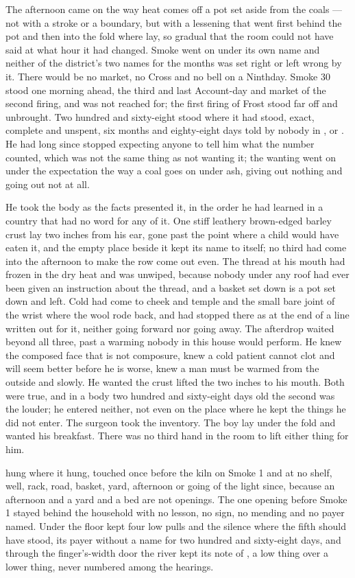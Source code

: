 The afternoon came on the way heat comes off a pot set aside from the coals --- not with a stroke or a boundary, but with a lessening that went first behind the pot and then into the fold where  lay, so gradual that the room could not have said at what hour it had changed. Smoke went on under its own name and neither of the district's two names for the months was set right or left wrong by it. There would be no market, no Cross and no bell on a Ninthday. Smoke 30 stood one morning ahead, the third and last Account-day and market of the second firing, and was not reached for; the first firing of Frost stood far off and unbrought. Two hundred and sixty-eight stood where it had stood, exact, complete and unspent, six months and eighty-eight days told by nobody in ,  or . He had long since stopped expecting anyone to tell him what the number counted, which was not the same thing as not wanting it; the wanting went on under the expectation the way a coal goes on under ash, giving out nothing and going out not at all.

He took the body as the facts presented it, in the order he had learned in a country that had no word for any of it. One stiff leathery brown-edged barley crust lay two inches from his ear, gone past the point where a child would have eaten it, and the empty place beside it kept its name to itself; no third had come into the afternoon to make the row come out even. The thread at his mouth had frozen in the dry heat and was unwiped, because nobody under any roof had ever been given an instruction about the thread, and a basket set down is a pot set down and left. Cold had come to cheek and temple and the small bare joint of the wrist where the wool rode back, and had stopped there as at the end of a line written out for it, neither going forward nor going away. The afterdrop waited beyond all three, past a warming nobody in this house would perform. He knew the composed face that is not composure, knew a cold patient cannot clot and will seem better before he is worse, knew a man must be warmed from the outside and slowly. He wanted the crust lifted the two inches to his mouth. Both were true, and in a body two hundred and sixty-eight days old the second was the louder; he entered neither, not even on the place where he kept the things he did not enter. The surgeon took the inventory. The boy lay under the fold and wanted his breakfast. There was no third hand in the room to lift either thing for him.

 hung where it hung, touched once before the kiln on Smoke 1 and at no shelf, well, rack, road, basket, yard, afternoon or going of the light since, because an afternoon and a yard and a bed are not openings. The one opening before Smoke 1 stayed behind the household with no lesson, no sign, no mending and no payer named. Under the floor  kept four low pulls and the silence where the fifth should have stood, its payer without a name for two hundred and sixty-eight days, and through the finger's-width door the river kept its note of , a low thing over a lower thing, never numbered among the hearings.

